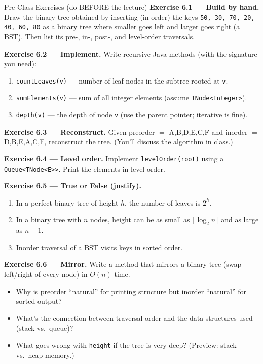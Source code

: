 \documentclass[11pt]{article}
\begin{document}
\begin{exbox}{Pre-Class Exercises (do BEFORE the lecture)}
\textbf{Exercise 6.1 --- Build by hand.} Draw the binary tree obtained by inserting (in order) the keys
\verb|50, 30, 70, 20, 40, 60, 80| as a binary tree where smaller goes left and larger goes right (a BST). Then list its pre-, in-, post-, and level-order traversals.

\textbf{Exercise 6.2 --- Implement.} Write recursive Java methods (with the signature you need):
\begin{enumerate}[label=(\alph*)]
  \item \verb|countLeaves(v)| --- number of leaf nodes in the subtree rooted at \texttt{v}.
  \item \verb|sumElements(v)| --- sum of all integer elements (assume \verb|TNode<Integer>|).
  \item \verb|depth(v)| --- the depth of node \texttt{v} (use the parent pointer; iterative is fine).
\end{enumerate}

\textbf{Exercise 6.3 --- Reconstruct.} Given preorder $=$ A,B,D,E,C,F and inorder $=$ D,B,E,A,C,F, reconstruct the tree. (You'll discuss the algorithm in class.)

\textbf{Exercise 6.4 --- Level order.} Implement \verb|levelOrder(root)| using a \verb|Queue<TNode<E>>|. Print the elements in level order.

\textbf{Exercise 6.5 --- True or False (justify).}
\begin{enumerate}[label=(\alph*)]
  \item In a perfect binary tree of height $h$, the number of leaves is $2^h$.
  \item In a binary tree with $n$ nodes, height can be as small as $\lfloor\log_2 n\rfloor$ and as large as $n-1$.
  \item Inorder traversal of a BST visits keys in sorted order.
\end{enumerate}

\textbf{Exercise 6.6 --- Mirror.} Write a method that mirrors a binary tree (swap left/right of every node) in $O(n)$ time.
\end{exbox}

\begin{disbox}
\begin{itemize}[leftmargin=*]
  \item Why is preorder ``natural'' for printing structure but inorder ``natural'' for sorted output?
  \item What's the connection between traversal order and the data structures used (stack vs.\ queue)?
  \item What goes wrong with \texttt{height} if the tree is very deep? (Preview: stack vs.\ heap memory.)
\end{itemize}
\end{disbox}
\end{document}
